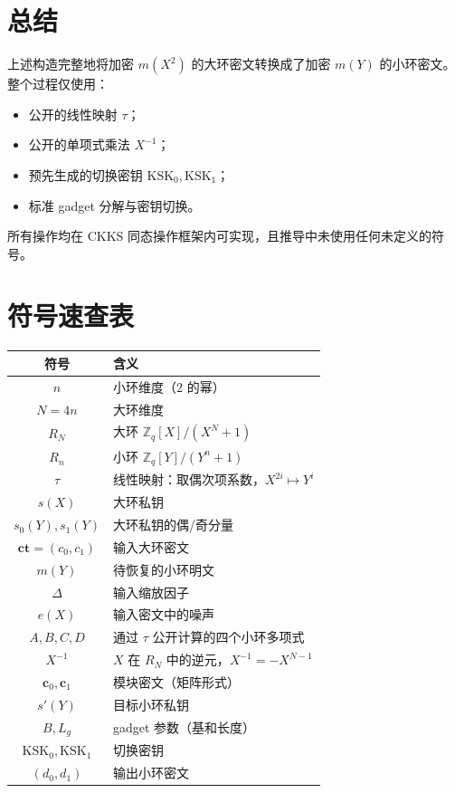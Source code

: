 \documentclass{article}
\begin{document}
\section{总结}

上述构造完整地将加密 $m(X^2)$ 的大环密文转换成了加密 $m(Y)$ 的小环密文。整个过程仅使用：
\begin{itemize}
\item 公开的线性映射 $\tau$；
\item 公开的单项式乘法 $X^{-1}$；
\item 预先生成的切换密钥 $\mathrm{KSK}_0, \mathrm{KSK}_1$；
\item 标准 gadget 分解与密钥切换。
\end{itemize}
所有操作均在 CKKS 同态操作框架内可实现，且推导中未使用任何未定义的符号。

\appendix
\section{符号速查表}

\begin{center}
\begin{tabular}{|c|l|}
\hline
符号 & 含义 \\
\hline
$n$ & 小环维度（2 的幂） \\
$N = 4n$ & 大环维度 \\
$R_N$ & 大环 $\mathbb{Z}_q[X]/(X^N+1)$ \\
$R_n$ & 小环 $\mathbb{Z}_q[Y]/(Y^n+1)$ \\
$\tau$ & 线性映射：取偶次项系数，$X^{2i}\mapsto Y^i$ \\
$s(X)$ & 大环私钥 \\
$s_0(Y), s_1(Y)$ & 大环私钥的偶/奇分量 \\
$\mathbf{ct}=(c_0,c_1)$ & 输入大环密文 \\
$m(Y)$ & 待恢复的小环明文 \\
$\Delta$ & 输入缩放因子 \\
$e(X)$ & 输入密文中的噪声 \\
$A,B,C,D$ & 通过 $\tau$ 公开计算的四个小环多项式 \\
$X^{-1}$ & $X$ 在 $R_N$ 中的逆元，$X^{-1}=-X^{N-1}$ \\
$\mathbf{c}_0, \mathbf{c}_1$ & 模块密文（矩阵形式） \\
$s'(Y)$ & 目标小环私钥 \\
$B, L_g$ & gadget 参数（基和长度） \\
$\mathrm{KSK}_0, \mathrm{KSK}_1$ & 切换密钥 \\
$(d_0,d_1)$ & 输出小环密文 \\
\hline
\end{tabular}
\end{center}
\end{document}

